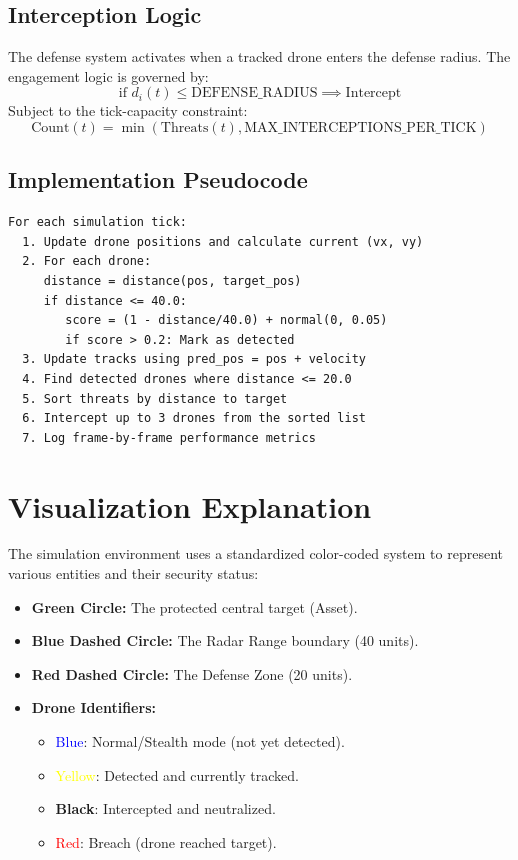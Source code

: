 \documentclass[11pt,a4paper]{article}
\begin{document}
\subsection{Interception Logic}
The defense system activates when a tracked drone enters the defense radius. The engagement logic is governed by:
\begin{equation}
    \text{if } d_i(t) \le \text{DEFENSE\_RADIUS} \implies \text{Intercept}
\end{equation}
Subject to the tick-capacity constraint:
\begin{equation}
    \text{Count}(t) = \min(\text{Threats}(t), \text{MAX\_INTERCEPTIONS\_PER\_TICK})
\end{equation}

\subsection{Implementation Pseudocode}
\begin{verbatim}
For each simulation tick:
  1. Update drone positions and calculate current (vx, vy)
  2. For each drone:
     distance = distance(pos, target_pos)
     if distance <= 40.0:
        score = (1 - distance/40.0) + normal(0, 0.05)
        if score > 0.2: Mark as detected
  3. Update tracks using pred_pos = pos + velocity
  4. Find detected drones where distance <= 20.0
  5. Sort threats by distance to target
  6. Intercept up to 3 drones from the sorted list
  7. Log frame-by-frame performance metrics
\end{verbatim}

\section{Visualization Explanation}
The simulation environment uses a standardized color-coded system to represent various entities and their security status:

\begin{itemize}
    \item \textbf{Green Circle:} The protected central target (Asset).
    \item \textbf{Blue Dashed Circle:} The Radar Range boundary (40 units).
    \item \textbf{Red Dashed Circle:} The Defense Zone (20 units).
    \item \textbf{Drone Identifiers:}
    \begin{itemize}
        \item \textcolor{blue}{Blue}: Normal/Stealth mode (not yet detected).
        \item \textcolor{yellow}{Yellow}: Detected and currently tracked.
        \item \textbf{Black}: Intercepted and neutralized.
        \item \textcolor{red}{Red}: Breach (drone reached target).
    \end{itemize}
\end{itemize}
\end{document}
